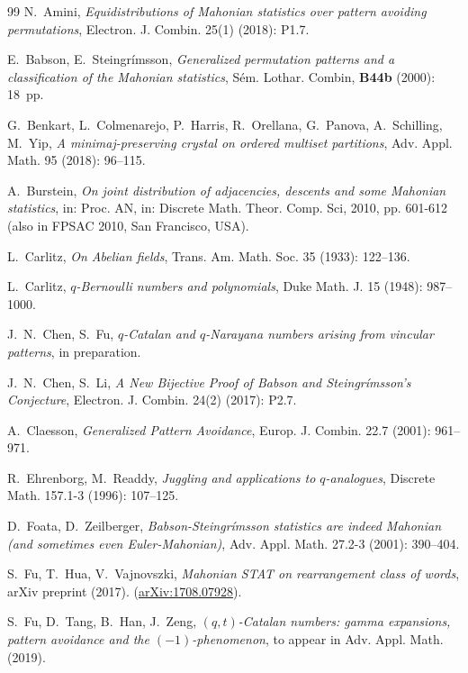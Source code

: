 \documentclass[12pt]{amsart}
\numberwithin{equation}{section}
\theoremstyle{plain}
\theoremstyle{definition}
\begin{document}
\begin{thebibliography}{99}
N.~Amini, \emph{Equidistributions of Mahonian statistics over pattern avoiding permutations}, Electron. J. Combin. 25(1) (2018): P1.7.

E.~Babson, E.~Steingr\'{i}msson, \emph{Generalized permutation patterns and a classification of the Mahonian statistics}, S\'{e}m. Lothar. Combin, {\bf B44b} (2000): 18~pp.

 G.~Benkart, L.~Colmenarejo, P.~Harris, R.~Orellana, G.~Panova, A.~Schilling, M.~Yip, \emph{A minimaj-preserving crystal on ordered multiset partitions}, Adv. Appl. Math. 95 (2018): 96--115.

A.~Burstein, \emph{On joint distribution of adjacencies, descents and some Mahonian statistics}, in: Proc. AN, in: Discrete Math. Theor. Comp. Sci, 2010, pp. 601-612 (also in FPSAC 2010, San Francisco, USA).

L.~Carlitz, \emph{On Abelian fields}, Trans. Am. Math. Soc. 35 (1933): 122--136.

L.~Carlitz, \emph{$q$-Bernoulli numbers and polynomials}, Duke Math. J. 15 (1948): 987--1000.

J.~N.~Chen, S.~Fu, \emph{$q$-Catalan and $q$-Narayana numbers arising from vincular patterns}, in preparation.

J.~N.~Chen, S.~Li, \emph{A New Bijective Proof of Babson and Steingr\'{i}msson's Conjecture}, Electron. J. Combin. 24(2) (2017): P2.7.



A.~Claesson, \emph{Generalized Pattern Avoidance},
Europ. J. Combin. 22.7 (2001): 961--971.

R.~Ehrenborg, M.~Readdy, \emph{Juggling and applications to $q$-analogues}, Discrete Math. 157.1-3 (1996): 107--125.

D.~Foata, D.~Zeilberger, \emph{Babson-Steingr\'{i}msson statistics are indeed Mahonian (and sometimes even Euler-Mahonian)}, Adv. Appl. Math. 27.2-3 (2001): 390--404.

S.~Fu, T.~Hua, V.~Vajnovszki, \emph{Mahonian STAT on rearrangement class of words}, arXiv preprint (2017). (\href{http://arxiv.org/abs/1708.07928}{arXiv:1708.07928}).

S.~Fu, D.~Tang, B.~Han, J.~Zeng, \emph{$(q,t)$-Catalan numbers: gamma expansions, pattern avoidance and the $(-1)$-phenomenon}, to appear in Adv. Appl. Math. (2019).


\end{thebibliography}
\end{document}
